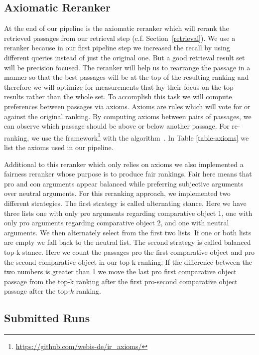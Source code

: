 \subsection{Axiomatic Reranker}
\label{reranking}



At the end of our pipeline is the axiomatic reranker which will rerank the retrieved passages from our retrieval step (c.f. Section~\ref{retrieval}).
We use a reranker because in our first pipeline step we increased the recall by using different queries instead of just the original one.
But a good retrieval result set will be precision focused.
The reranker will help us to rearrange the passage in a manner so that the best passages will be at the top of the resulting ranking and therefore we will optimize for measurements that lay their focus on the top results rather than the whole set.
To accomplish this task we will compute preferences between passages via axioms.
Axioms are rules which will vote for or against the original ranking.
By computing axioms between pairs of passages, we can observe which passage should be above or below another passage.
For re-ranking, we use the \iraxioms framework\footnote{\url{https://github.com/webis-de/ir_axioms/}} with the \KwikSort algorithm~\cite{HagenVGS2016}.
In Table \ref{table-axioms} we list the axioms used in our pipeline.

Additional to this reranker which only relies on axioms we also implemented a fairness reranker whose purpose is to produce fair rankings. Fair here means that pro and con arguments appear balanced while preferring subjective arguments over neutral arguments. For this reranking approach, we implemented two different strategies. The first strategy is called alternating stance. Here we have three lists one with only pro arguments regarding comparative object 1, one with only pro arguments regarding comparative object 2, and one with neutral arguments. We then alternately select from the first two lists. If one or both lists are empty we fall back to the neutral list. The second strategy is called balanced top-k stance. Here we count the passages pro the first comparative object and pro the second comparative object in our top-k ranking. If the difference between the two numbers is greater than 1 we move the last pro first comparative object passage from the top-k ranking after the first pro-second comparative object passage after the top-\(k\) ranking.

\subsection{Submitted Runs}

